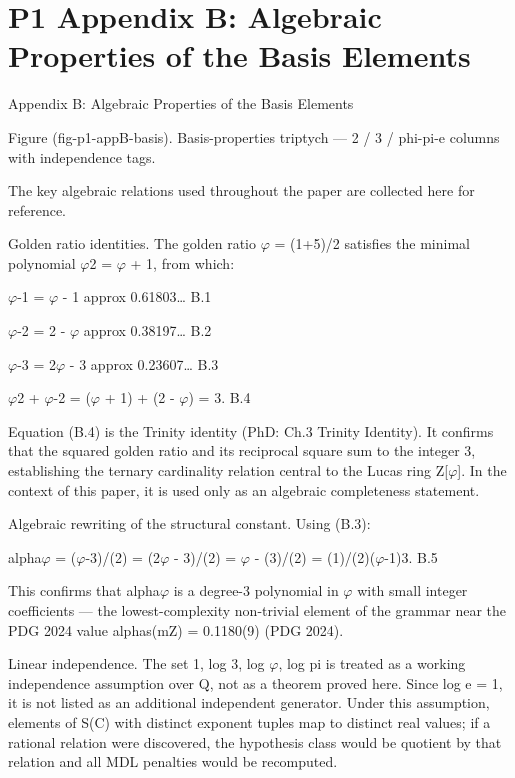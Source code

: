 
\section{P1 Appendix B: Algebraic Properties of the Basis Elements}

Appendix B: Algebraic Properties of the Basis Elements

                 Figure (fig-p1-appB-basis). Basis-properties triptych --- 2 / 3 / phi-pi-e columns with
                                                 independence tags.

  The key algebraic relations used throughout the paper are collected here for reference.

  Golden ratio identities. The golden ratio $\varphi$ = (1+5)/2 satisfies the minimal polynomial
  $\varphi$2 = $\varphi$ + 1, from which:

  $\varphi$-1 = $\varphi$ - 1 approx 0.61803… B.1

  $\varphi$-2 = 2 - $\varphi$ approx 0.38197… B.2

  $\varphi$-3 = 2$\varphi$ - 3 approx 0.23607… B.3

  $\varphi$2 + $\varphi$-2 = ($\varphi$ + 1) + (2 - $\varphi$) = 3. B.4

  Equation (B.4) is the Trinity identity (PhD: Ch.3 Trinity Identity). It confirms that the
  squared golden ratio and its reciprocal square sum to the integer 3, establishing the
  ternary cardinality relation central to the Lucas ring Z[$\varphi$]. In the context of this paper, it
  is used only as an algebraic completeness statement.

  Algebraic rewriting of the structural constant. Using (B.3):

  alpha$\varphi$ = ($\varphi$-3)/(2) = (2$\varphi$ - 3)/(2) = $\varphi$ - (3)/(2) = (1)/(2)($\varphi$-1)3. B.5

  This confirms that alpha$\varphi$ is a degree-3 polynomial in $\varphi$ with small integer coefficients
  --- the lowest-complexity non-trivial element of the grammar near the PDG 2024 value
  alphas(mZ) = 0.1180(9) (PDG 2024).

  Linear independence. The set {1, log 3, log $\varphi$, log pi} is treated as a working
  independence assumption over Q, not as a theorem proved here. Since log e = 1, it is
  not listed as an additional independent generator. Under this assumption, elements of
  S(C) with distinct exponent tuples map to distinct real values; if a rational relation were
  discovered, the hypothesis class would be quotient by that relation and all MDL
  penalties would be recomputed.

